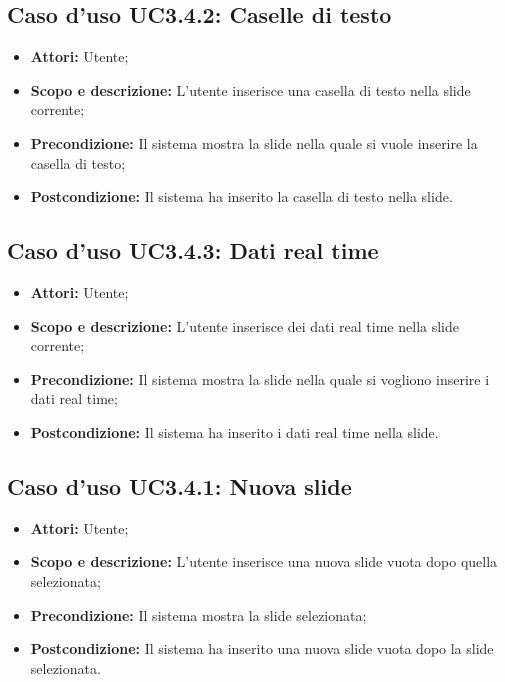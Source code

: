 \subsection{Caso d'uso UC3.4.2: Caselle di testo}
\begin{itemize}
	\item \textbf{Attori:} Utente;
	\item \textbf{Scopo e descrizione:} L'utente inserisce una casella di testo nella slide corrente;
	\item \textbf{Precondizione:} Il sistema mostra la slide nella quale si vuole inserire la casella di testo;
	\item \textbf{Postcondizione:} Il sistema ha inserito la casella di testo nella slide.
\end{itemize}

\subsection{Caso d'uso UC3.4.3: Dati real time}
\begin{itemize}
	\item \textbf{Attori:} Utente;
	\item \textbf{Scopo e descrizione:} L'utente inserisce dei dati \gls{real time} nella slide corrente;
	\item \textbf{Precondizione:} Il sistema mostra la slide nella quale si vogliono inserire i dati \gls{real time};
	\item \textbf{Postcondizione:} Il sistema ha inserito i dati \gls{real time} nella slide.
\end{itemize}

\subsection{Caso d'uso UC3.4.1: Nuova slide}
\begin{itemize}
	\item \textbf{Attori:} Utente;
	\item \textbf{Scopo e descrizione:} L'utente inserisce una nuova slide vuota dopo quella selezionata;
	\item \textbf{Precondizione:} Il sistema mostra la slide selezionata;
	\item \textbf{Postcondizione:} Il sistema ha inserito una nuova slide vuota dopo la slide selezionata.
\end{itemize}